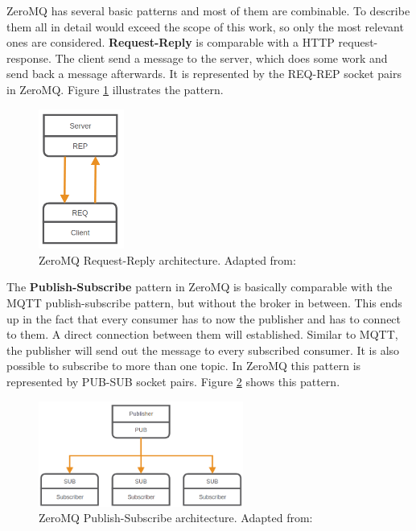 ZeroMQ has several basic patterns and most of them are combinable.
To describe them all in detail would exceed the scope of this work, so only the most relevant ones are considered.\newline
\textbf{Request-Reply} is comparable with a \ac{HTTP} request-response.
The client send a message to the server, which does some work and send back a message afterwards.
It is represented by the REQ-REP socket pairs in ZeroMQ.
Figure \ref{fig:zeromq_req_rep} illustrates the pattern.\newline
\begin{figure}[H]
    \centering
    \includegraphics[width=0.25\textwidth]{resources/images/zeromq-req-rep.png}
    \caption[ZeroMQ Request-Reply architecture]{ZeroMQ Request-Reply architecture. Adapted from: \autocite{ZeroMQ:Guide}}
    \label{fig:zeromq_req_rep}
\end{figure}

The \textbf{Publish-Subscribe} pattern in ZeroMQ is basically comparable with the MQTT publish-subscribe pattern, but without the broker in between.
This ends up in the fact that every consumer has to now the publisher and has to connect to them.
A direct connection between them will established.
Similar to MQTT, the publisher will send out the message to every subscribed consumer.
It is also possible to subscribe to more than one topic.
In ZeroMQ this pattern is represented by PUB-SUB socket pairs.
Figure \ref{fig:zeromq_pub_sub} shows this pattern.

\begin{figure}[H]
    \centering
    \includegraphics[width=0.6\textwidth]{resources/images/zeromq-pub-sub.png}
    \caption[ZeroMQ Publish-Subscribe architecture]{ZeroMQ Publish-Subscribe architecture. Adapted from: \autocite{ZeroMQ:Guide}}
    \label{fig:zeromq_pub_sub}
\end{figure}

